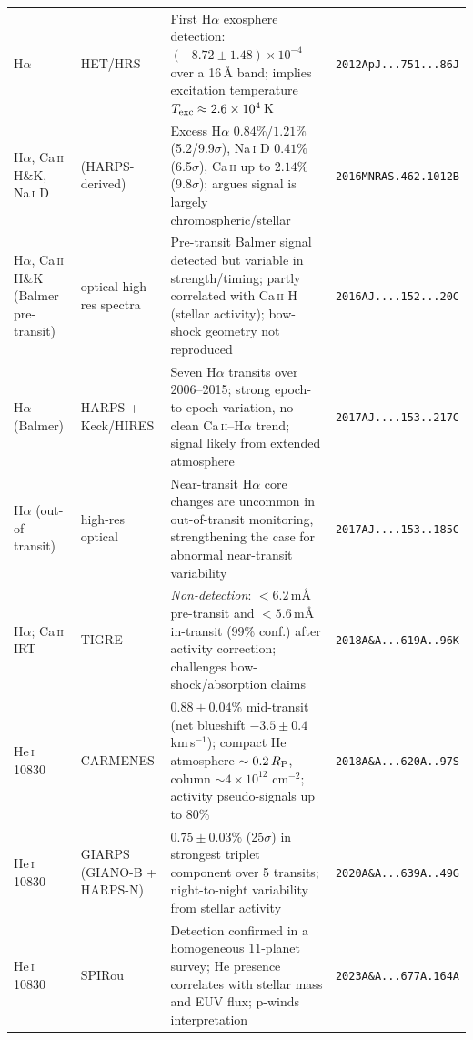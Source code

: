\begin{longtable}{@{}p{}p{}p{}p{}@{}}
H$\alpha$ &
HET/HRS &
First H$\alpha$ exosphere detection: $(-8.72\pm1.48)\times10^{-4}$ over a 16\,\AA{} band; implies excitation temperature $T_{\rm exc}\approx2.6\times10^{4}$\,K &
\texttt{2012ApJ...751...86J} \\

H$\alpha$, Ca\,\textsc{ii} H\&K, Na\,\textsc{i} D &
(HARPS-derived) &
Excess H$\alpha$ $0.84\%$/$1.21\%$ (5.2/9.9$\sigma$), Na\,\textsc{i} D $0.41\%$ (6.5$\sigma$), Ca\,\textsc{ii} up to $2.14\%$ (9.8$\sigma$); argues signal is largely chromospheric/stellar &
\texttt{2016MNRAS.462.1012B} \\

H$\alpha$, Ca\,\textsc{ii} H\&K (Balmer pre-transit) &
optical high-res spectra &
Pre-transit Balmer signal detected but variable in strength/timing; partly correlated with Ca\,\textsc{ii} H (stellar activity); bow-shock geometry not reproduced &
\texttt{2016AJ....152...20C} \\

H$\alpha$ (Balmer) &
HARPS + Keck/HIRES &
Seven H$\alpha$ transits over 2006--2015; strong epoch-to-epoch variation, no clean Ca\,\textsc{ii}--H$\alpha$ trend; signal likely from extended atmosphere &
\texttt{2017AJ....153..217C} \\

H$\alpha$ (out-of-transit) &
high-res optical &
Near-transit H$\alpha$ core changes are uncommon in out-of-transit monitoring, strengthening the case for abnormal near-transit variability &
\texttt{2017AJ....153..185C} \\

H$\alpha$; Ca\,\textsc{ii} IRT &
TIGRE &
\emph{Non-detection}: $<6.2$\,m\AA{} pre-transit and $<5.6$\,m\AA{} in-transit (99\% conf.) after activity correction; challenges bow-shock/absorption claims &
\texttt{2018A\&A...619A..96K} \\

He\,\textsc{i} 10830 &
CARMENES &
$0.88\pm0.04\%$ mid-transit (net blueshift $-3.5\pm0.4$ km\,s$^{-1}$); compact He atmosphere $\sim0.2\,R_{\rm P}$, column $\sim4\times10^{12}$ cm$^{-2}$; activity pseudo-signals up to 80\% &
\texttt{2018A\&A...620A..97S} \\

He\,\textsc{i} 10830 &
GIARPS (GIANO-B + HARPS-N) &
$0.75\pm0.03\%$ (25$\sigma$) in strongest triplet component over 5 transits; night-to-night variability from stellar activity &
\texttt{2020A\&A...639A..49G} \\

He\,\textsc{i} 10830 &
SPIRou &
Detection confirmed in a homogeneous 11-planet survey; He presence correlates with stellar mass and EUV flux; p-winds interpretation &
\texttt{2023A\&A...677A.164A} \\


\end{longtable}
